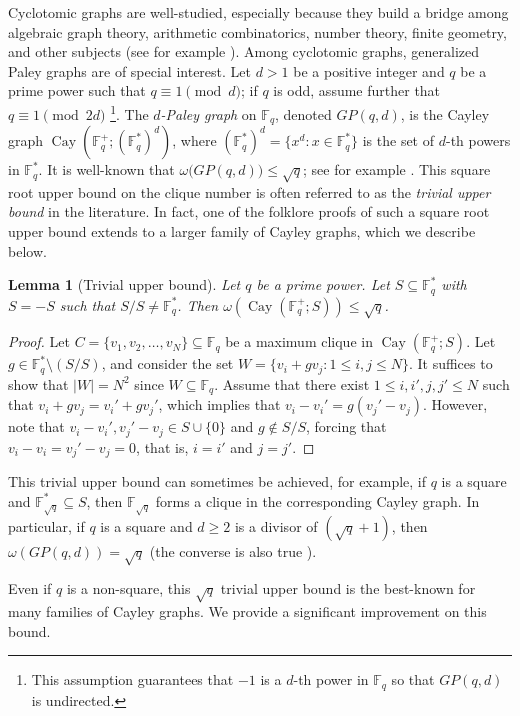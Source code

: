 \documentclass[12pt,reqno]{amsart}
\newtheorem{lem}[thm]{Lemma}
\theoremstyle{definition}
\newcommand{\F}{\mathbb{F}}
\begin{document}
Cyclotomic graphs are well-studied, especially because they build a bridge among algebraic graph theory, arithmetic combinatorics, number theory, finite geometry, and other subjects (see for example \cite{AY22, BWX99, DSW, FX12, HP, Y22, Y25+}). Among cyclotomic graphs, generalized Paley graphs are of special interest. Let $d>1$ be a positive integer and $q$ be a prime power such that $q\equiv 1 \pmod {d}$; if $q$ is odd, assume further that $q \equiv 1 \pmod {2d}$ \footnote{This assumption guarantees that $-1$ is a $d$-th power in $\F_q$ so that $GP(q,d)$ is undirected.}. The {\em $d$-Paley graph} on $\F_q$, denoted $GP(q,d)$, is the Cayley graph $\operatorname{Cay}(\F_q^+;(\F_q^*)^d)$, where $(\F_q^*)^d=\{x^d: x \in \F_q^*\}$ is the set of $d$-th powers in $\F_q^*$. It is well-known that $\omega\big(GP(q,d)\big) \leq \sqrt{q}$; see for example \cite[Theorem 1.1]{Yip4}. This square root upper bound on the clique number is often referred to as the {\em trivial upper bound} in the literature. In fact, one of the folklore proofs \cite[Lemma 1.2]{Yip1} of such a square root upper bound extends to a larger family of Cayley graphs, which we describe below. 
\begin{lem}[Trivial upper bound]\label{lem:tub}
Let $q$ be a prime power. Let $S \subseteq \F_q^*$ with $S=-S$ such that $S/S \neq \F_q^*$. Then $\omega(\operatorname{Cay}(\F_q^+;S))\leq \sqrt{q}$.
\end{lem} 
\begin{proof}
Let $C=\{v_1, v_2, \ldots, v_N\} \subseteq \F_q$ be a maximum clique in $\operatorname{Cay}(\F_q^+;S)$. Let $g \in \F_q^* \setminus (S/S)$, and consider the set $W=\{v_i+gv_j: 1 \leq i,j \leq N\}$. It suffices to show that $|W|=N^2$ since $W \subseteq \F_q$. Assume that there exist $1 \leq i,i',j,j' \leq N$ such that $v_i+gv_j=v_i'+gv_j'$, which implies that $v_i-v_i'=g(v_j'-v_j)$. However, note that $v_i-v_i', v_j'-v_j \in S \cup \{0\}$ and $g \notin S/S$, forcing that $v_i- v_i=v_j'-v_j=0$, that is, $i=i'$ and $j=j'$.
\end{proof}

This trivial upper bound can sometimes be achieved, for example, if $q$ is a square and $\F_{\sqrt{q}}^* \subseteq S$, then $\F_{\sqrt{q}}$ forms a clique in the corresponding Cayley graph. In particular, if $q$ is a square and $d \geq 2$ is a divisor of $(\sqrt{q}+1)$, then $\omega(GP(q,d))=\sqrt{q}$ \cite{BDR88} (the converse is also true \cite{Yip4, Y25+}).

Even if $q$ is a non-square, this $\sqrt{q}$ trivial upper bound is the best-known for many families of Cayley graphs. We provide a significant improvement on this bound.
\end{document}

